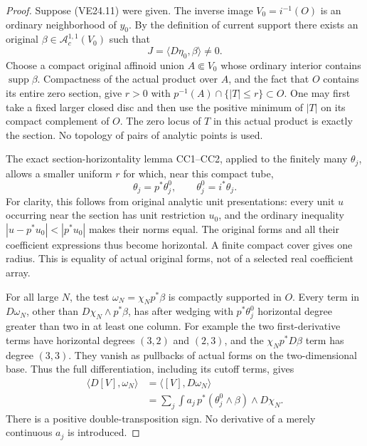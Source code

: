 \begin{proof}
Suppose (VE24.11) were given. The inverse image
\(V_0=i^{-1}(O)\) is an ordinary neighborhood of \(y_0\).
By the definition of current support there exists an original
\(\beta\in\mathcal A_c^{1,1}(V_0)\) such that
\[
                         J=\langle D\eta_0,\beta\rangle\ne0.
 \tag{VE24.12}
\]
Choose a compact original affinoid union \(A\Subset V_0\)
whose ordinary interior contains \(\operatorname{supp}\beta\).
Compactness of the actual product over \(A\), and the fact that
\(O\) contains its entire zero section, give \(r>0\) with
\(p^{-1}(A)\cap\{|T|\le r\}\subset O\).
One may first take a fixed larger closed disc and then use the
positive minimum of \(|T|\) on its compact complement of \(O\).
The zero locus of \(T\) in this actual product is exactly the
section. No topology of pairs of analytic points is used.

The exact section-horizontality lemma CC1--CC2, applied to the
finitely many \(\theta_j\), allows a smaller uniform \(r\)
for which, near this compact tube,
\[
                     \theta_j=p^*\theta_j^0,
                \qquad \theta_j^0=i^*\theta_j.
 \tag{VE24.13}
\]
For clarity, this follows from original analytic unit
presentations: every unit \(u\) occurring near the section has
unit restriction \(u_0\), and the ordinary inequality
\(|u-p^*u_0|<|p^*u_0|\) makes their norms equal.
The original forms and all their coefficient expressions thus
become horizontal. A finite compact cover gives one radius.
This is equality of actual original forms, not of a selected
real coefficient array.

For all large \(N\), the test
\(\omega_N=\chi_Np^*\beta\) is compactly supported in \(O\).
Every term in \(D\omega_N\), other than
\(D\chi_N\wedge p^*\beta\), has after wedging with
\(p^*\theta_j^0\) horizontal degree greater than two in at
least one column. For example the two first-derivative terms
have horizontal degrees \((3,2)\) and \((2,3)\), and the
\(\chi_Np^*D\beta\) term has degree \((3,3)\).
They vanish as pullbacks of actual forms on the two-dimensional
base. Thus the full differentiation, including its cutoff terms,
gives
\[
 \begin{split}
 \langle D[V],\omega_N\rangle
 &=\langle[V],D\omega_N\rangle\\
 &=\sum_j\int a_j\,p^*(\theta_j^0\wedge\beta)\wedge D\chi_N.
 \end{split}
 \tag{VE24.14}
\]
There is a positive double-transposition sign. No derivative
of a merely continuous \(a_j\) is introduced.


\end{proof}
